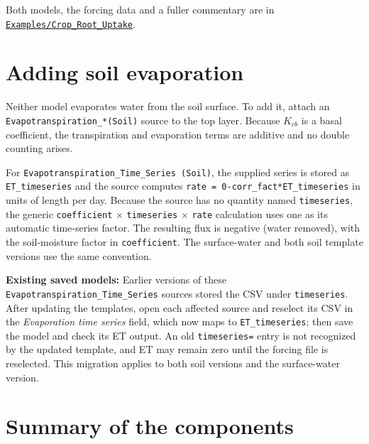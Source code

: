 \documentclass[11pt,a4paper]{article}
\newcommand{\code}[1]{\texttt{\small #1}}
\newcommand{\file}[1]{\texttt{\small #1}}
\newcommand{\ghtree}{https://github.com/ArashMassoudieh/OpenHydroQual/tree/master}
\newcommand{\exdir}[1]{\href{\ghtree/#1}{\file{#1}}}
\begin{document}
\medskip
\noindent
Both models, the forcing data and a fuller commentary are in
\exdir{Examples/Crop\_Root\_Uptake}.

\section{Adding soil evaporation}

Neither model evaporates water from the soil surface. To add it, attach an
\code{Evapotranspiration\_*(Soil)} source to the top layer. Because $K_{cb}$ is
a basal coefficient, the transpiration and evaporation terms are additive and
no double counting arises.

For \code{Evapotranspiration\_Time\_Series (Soil)}, the supplied series
is stored as \code{ET\_timeseries} and the source computes
\code{rate = 0-corr\_fact*ET\_timeseries} in units of length per day.
Because the source has no quantity named \code{timeseries}, the generic
\code{coefficient} $\times$ \code{timeseries} $\times$ \code{rate}
calculation uses one as its automatic time-series factor. The resulting
flux is negative (water removed), with the soil-moisture factor in
\code{coefficient}. The surface-water and both soil template versions
use the same convention.

\textbf{Existing saved models:} Earlier versions of these
\code{Evapotranspiration\_Time\_Series} sources stored the CSV under
\code{timeseries}. After updating the templates, open each affected source
and reselect its CSV in the \emph{Evaporation time series} field, which now
maps to \code{ET\_timeseries}; then save the model and check its ET output.
An old \code{timeseries=} entry is not recognized by the updated template,
and ET may remain zero until the forcing file is reselected. This migration
applies to both soil versions and the surface-water version.

\section{Summary of the components}
\end{document}
